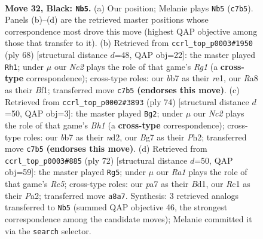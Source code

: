 \documentclass[11pt]{article}
\begin{document}
\clearpage

\begin{figure}[p]\centering
\begin{subfigure}{0.46\textwidth}\centering
\resizebox{\linewidth}{!}{%
\newchessgame
\chessboard[
  setfen={r7/PBn2kb1/1p4p1/2p5/6pP/R7/3NR2K/2r5 b - - 3 32},
  showmover=false,
  pgfstyle=straightmove, color=movearrow, markmove={c7-b5}
]}
\caption{}
\end{subfigure}\hfill
\begin{subfigure}{0.46\textwidth}\centering
\resizebox{\linewidth}{!}{%
\newchessgame
\chessboard[
  setfen={2R5/2b2r1k/8/1p1P1p2/5p1p/P4P2/KP6/4rBR1 w - - 8 35},
  showmover=false,
  pgfstyle=straightmove, color=movearrow, markmove={g1-h1}
]}
\caption{}
\end{subfigure}
\\[4pt]
\begin{subfigure}{0.46\textwidth}\centering
\resizebox{\linewidth}{!}{%
\newchessgame
\chessboard[
  setfen={3r1k2/6RR/1r4p1/1p6/8/PP6/2Pn1p1P/2K4B w - - 2 38},
  showmover=false,
  pgfstyle=straightmove, color=movearrow, markmove={h1-g2}
]}
\caption{}
\end{subfigure}\hfill
\begin{subfigure}{0.46\textwidth}\centering
\resizebox{\linewidth}{!}{%
\newchessgame
\chessboard[
  setfen={2kr4/2pn1R2/b7/2R5/4P2P/p1P5/P2N4/2KB2r1 w - - 2 37},
  showmover=false,
  pgfstyle=straightmove, color=movearrow, markmove={c5-g5}
]}
\caption{}
\end{subfigure}
\caption{\textbf{Move 32, Black: \texttt{Nb5}.} (a) Our position; Melanie plays \texttt{Nb5} (\texttt{c7b5}). Panels (b)--(d) are the retrieved master positions whose correspondence most drove this move (highest QAP objective among those that transfer to it). (b) Retrieved from \texttt{ccrl\_top\_p0003\#1950} (ply 68) [structural distance $d$=48, QAP obj=22]: the master played \texttt{Rh1}; under $\mu$ our \emph{Nc2} plays the role of that game's \emph{Rg1} (a \textbf{cross-type} correspondence); cross-type roles: our \emph{b}b7 as their \emph{r}e1, our \emph{R}a8 as their \emph{B}f1; transferred move \texttt{c7b5} \textbf{(endorses this move)}. (c) Retrieved from \texttt{ccrl\_top\_p0002\#3893} (ply 74) [structural distance $d$=50, QAP obj=3]: the master played \texttt{Bg2}; under $\mu$ our \emph{Nc2} plays the role of that game's \emph{Bh1} (a \textbf{cross-type} correspondence); cross-type roles: our \emph{b}b7 as their \emph{n}d2, our \emph{B}g7 as their \emph{P}h2; transferred move \texttt{c7b5} \textbf{(endorses this move)}. (d) Retrieved from \texttt{ccrl\_top\_p0003\#885} (ply 72) [structural distance $d$=50, QAP obj=59]: the master played \texttt{Rg5}; under $\mu$ our \emph{Ra1} plays the role of that game's \emph{Rc5}; cross-type roles: our \emph{p}a7 as their \emph{B}d1, our \emph{R}c1 as their \emph{P}a2; transferred move \texttt{a8a7}. Synthesis: 3 retrieved analogs transferred to \texttt{Nb5} (summed QAP objective 46, the strongest correspondence among the candidate moves); Melanie committed it via the \texttt{search} selector.}
\label{fig:thought-m63}
\end{figure}
\end{document}
